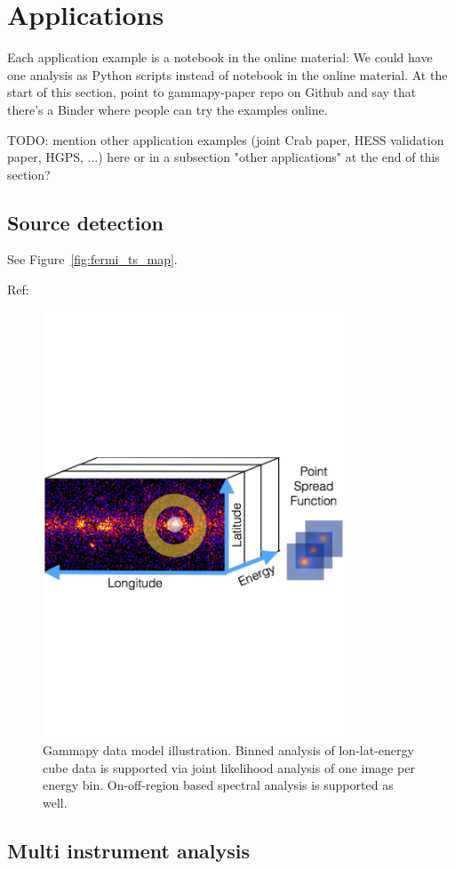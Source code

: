 \section{Applications}
\label{sec:applications}

Each application example is a notebook in the online material: We could have
one analysis as Python scripts instead of notebook in the online material. At
the start of this section, point to gammapy-paper repo on Github and say that
there’s a Binder where people can try the examples online.

TODO: mention other application examples (joint Crab paper, HESS validation
paper, HGPS, ...) here or in a subsection "other applications" at the end of
this section?

\subsection{Source detection}
\label{ssec:source-detection}

See Figure~\ref{fig:fermi_ts_map}.

Ref:~\citep{Stewart2009}

\begin{figure}[t]
	\centering
	\includegraphics[width=0.8\textwidth]{static/gammapy-cube-analysis}
	\caption{
		Gammapy data model illustration. Binned analysis of lon-lat-energy cube data is
		supported via joint likelihood analysis of one image per energy bin.
		On-off-region based spectral analysis is supported as well. }
	\label{fig:data-model}
\end{figure}

\subsection{Multi instrument analysis}
\label{ssec:multi-instrument-analysis}
